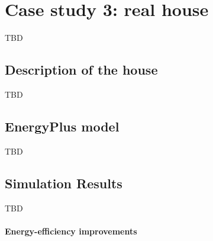\section{Case study 3: real house} TBD

\subsection{Description of the house} TBD

\subsection{EnergyPlus model} TBD

\subsection{Simulation Results} TBD

\paragraph{Energy-efficiency improvements}